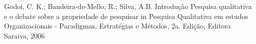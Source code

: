 \documentclass[
12pt,		%
openright,	%
twoside,  %
a4paper,			%
chapter=TITLE,		%
english,			%
french,				%
spanish,			%
brazil				%
]{USPSC-classe/USPSC}
\begin{document}
\begin{flushleft}
\begin{flushleft}
\begin{flushleft}
\begin{flushleft}
\begin{flushleft}
\begin{flushleft}
\begin{flushleft}
\begin{flushleft}
\begin{flushleft}
\begin{flushleft}
\begin{flushleft}
\begin{flushleft}
\begin{flushleft}
\begin{flushleft}
\begin{flushleft}
\begin{flushleft}
\begin{flushleft}
[GODOI et al., 2006] Godoi, C. K.; Bandeira-de-Mello, R.; Silva, A.B. Introdu\c{c}\~ao Pesquisa qualitativa e o debate sobre a propriedade de pesquisar in Pesquisa Qualitativa em estudos Organizacionais - Paradigmas, Estrat\'egias e M\'etodos, 2a. Edi\c{c}\~ao, Editora Saraiva, 2006
\end{flushleft}


\end{flushleft}


\end{flushleft}


\end{flushleft}


\end{flushleft}


\end{flushleft}


\end{flushleft}


\end{flushleft}


\end{flushleft}


\end{flushleft}


\end{flushleft}


\end{flushleft}


\end{flushleft}


\end{flushleft}


\end{flushleft}


\end{flushleft}


\end{flushleft}
\end{document}

